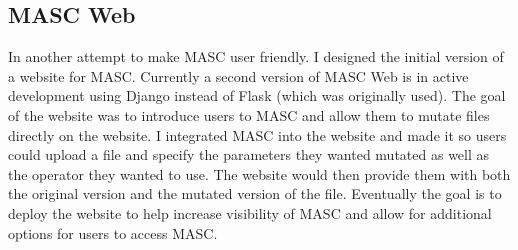 \subsection{MASC Web}
\label{ch3:subsec:web}

In another attempt to make MASC user friendly. I designed the initial version of a website for MASC. Currently a second version of MASC Web is in active development using Django instead of Flask (which was originally used). The goal of the website was to introduce users to MASC and allow them to mutate files directly on the website. I integrated MASC into the website and made it so users could upload a file and specify the parameters they wanted mutated as well as the operator they wanted to use. The website would then provide them with both the original version and the mutated version of the file. Eventually the goal is to deploy the website to help increase visibility of MASC and allow for additional options for users to access MASC.


